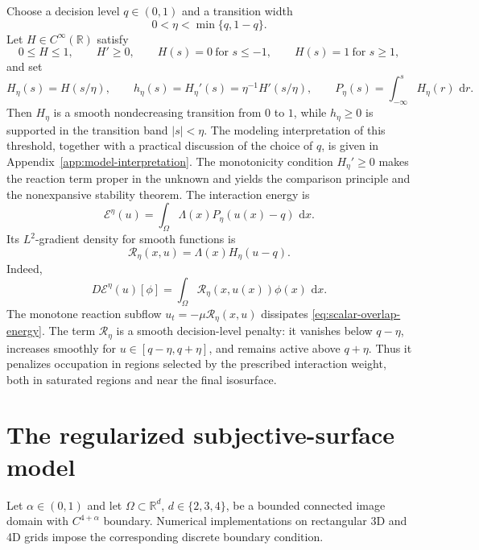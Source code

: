 \documentclass[11pt]{article}
\theoremstyle{remark}
\newcommand{\R}{\mathbb{R}}
\newcommand{\dd}{\,\mathrm{d}}
\newcommand{\cT}{\mathcal{R}}
\newcommand{\cE}{\mathcal{E}}
\begin{document}
Choose a decision level $q\in(0,1)$ and a transition width
\[
        0<\eta<\min\{q,1-q\}.
\]
Let ${H}\in C^\infty(\R)$ satisfy
\[
        0\le H\le1,
        \qquad H'\ge0,
        \qquad H(s)=0\ \text{for }s\le-1,
        \qquad H(s)=1\ \text{for }s\ge1,
\]
and set
\begin{equation}\label{eq:profiles}
        H_\eta(s)=H(s/\eta),\qquad
        h_\eta(s)=H_\eta'(s)=\eta^{-1}H'(s/\eta),
        \qquad
        P_\eta(s)=\int_{-\infty}^{s}H_\eta(r)\,\dd r .
\end{equation}
Then $H_\eta$ is a smooth nondecreasing transition from $0$ to $1$, while
$h_\eta\ge0$ is supported in the transition band $|s|<\eta$. The modeling interpretation of this threshold, together with a practical discussion of the choice of $q$, is given in Appendix~\ref{app:model-interpretation}.  The monotonicity condition $H_\eta'\ge0$ makes the reaction term proper in the unknown and yields the comparison principle and the nonexpansive stability theorem.  The interaction energy is
\begin{equation}\label{eq:scalar-overlap-energy}
        \cE^\eta(u)=\int_\Omega \Lambda(x)P_\eta(u(x)-q)\,\dd x.
\end{equation}
Its $L^2$-gradient density for smooth functions is
\begin{equation}\label{eq:topology-reaction}
        \cT_\eta(x,u)=\Lambda(x)H_\eta(u-q).
\end{equation}
Indeed,
\begin{equation}\label{eq:scalar-variation}
        D\cE^\eta(u)[\phi]
        =\int_\Omega \cT_\eta(x,u(x))\phi(x)\,\dd x.
\end{equation}
The monotone reaction subflow $u_t=-\mu\cT_\eta(x,u)$ dissipates \eqref{eq:scalar-overlap-energy}. The term
$\cT_\eta$ is a smooth decision-level penalty: it vanishes below
$q-\eta$, increases smoothly for $u\in[q-\eta,q+\eta]$, and remains active
above $q+\eta$. Thus it penalizes occupation in regions selected by the prescribed interaction weight, both in saturated regions and near the final isosurface.





\section{The regularized subjective-surface model}
\label{sec:model}

Let $\alpha\in(0,1)$ and let $\Omega\subset\R^d$, $d\in\{2,3,4\}$, be a bounded connected image domain with $C^{4+\alpha}$ boundary. Numerical implementations on rectangular 3D and 4D grids impose the corresponding discrete boundary condition.
\end{document}
